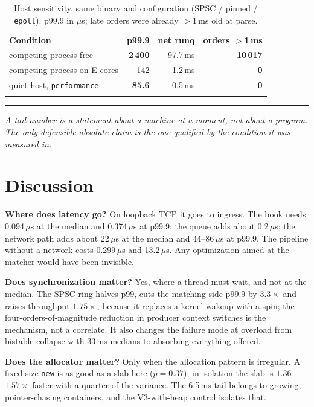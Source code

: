 \documentclass[conference]{IEEEtran}
\newcommand{\reading}[1]{%
  \par\vspace{1pt}\noindent
  \textcolor{corange}{\rule[-0.2ex]{2.2pt}{1.05em}}\hspace{3pt}%
  \textit{\textcolor{cgray}{#1}}\par\vspace{2pt}}
\newcommand{\us}{\,$\mu$s}
\begin{document}
\begin{table}[!t]
\centering
\caption{Host sensitivity, same binary and configuration
(SPSC / pinned / \texttt{epoll}). p99.9 in $\mu$s; late orders were already
$>$1\,ms old at parse.}
\label{tab:host}
\small
\setlength{\tabcolsep}{4pt}
\begin{tabular}{@{}lrrr@{}}
\arrayrulecolor{cblue}\toprule
\rowcolor{cblueL}\textbf{Condition} & \textbf{p99.9} & \textbf{net runq} & \textbf{orders $>$1\,ms} \\
\arrayrulecolor{cblue!45}\midrule
\rowcolor{credL}competing process free & \textcolor{cred}{\textbf{2\,400}} & 97.7\,ms & \textcolor{cred}{\textbf{10\,017}} \\
\rowcolor{cgreenL}competing process on E-cores & 142 & 1.2\,ms & \textbf{0} \\
\rowcolor{cblueL!60}quiet host, \texttt{performance} & \textbf{85.6} & 0.5\,ms & \textbf{0} \\
\arrayrulecolor{cblue}\bottomrule
\end{tabular}
\end{table}

\reading{A tail number is a statement about a machine at a moment, not about a
program. The only defensible absolute claim is the one qualified by the
condition it was measured in.}

\section{Discussion}
\label{sec:discussion}

\textbf{Where does latency go?} On loopback TCP it goes to ingress. The book
needs 0.094\us{} at the median and 0.374\us{} at p99.9; the queue adds about
0.2\us; the network path adds about 22\us{} at the median and 44--86\us{} at
p99.9. The pipeline without a network costs 0.299\us{} and 13.2\us. Any
optimization aimed at the matcher would have been invisible.

\textbf{Does synchronization matter?} Yes, where a thread must wait, and not at
the median. The SPSC ring halves p99, cuts the matching-side p99.9 by
$3.3\times$ and raises throughput $1.75\times$, because it replaces a kernel
wakeup with a spin; the four-orders-of-magnitude reduction in producer context
switches is the mechanism, not a correlate. It also changes the failure mode at
overload from bistable collapse with 33\,ms medians to absorbing everything
offered.

\textbf{Does the allocator matter?} Only when the allocation pattern is
irregular. A fixed-size \texttt{new} is as good as a slab here ($p=0.37$); in
isolation the slab is $1.36$--$1.57\times$ faster with a quarter of the variance.
The 6.5\,ms tail belongs to growing, pointer-chasing containers, and the
V3-with-heap control isolates that.
\end{document}
